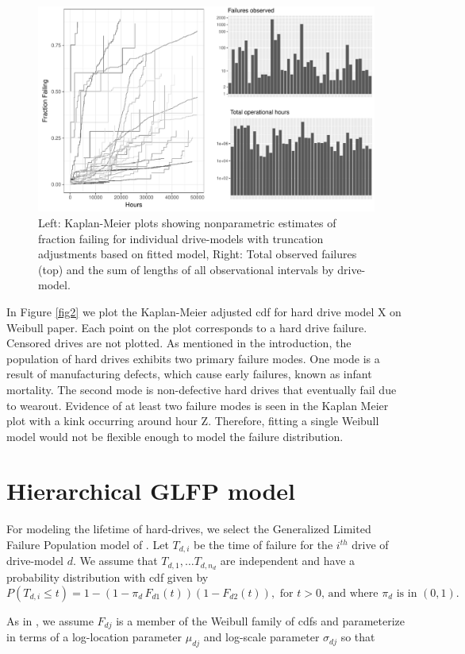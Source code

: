 \documentclass[12pt]{article}
\begin{document}
\begin{figure}
\includegraphics[width=.8\textwidth]{fig/data_overview}
\caption{Left: Kaplan-Meier plots showing nonparametric estimates of fraction failing for individual drive-models with truncation adjustments based on fitted model, Right: Total observed failures (top) and the sum of lengths of all observational intervals by drive-model.}
\end{figure}

In Figure \ref{fig2} we plot the Kaplan-Meier adjusted cdf for hard drive model X on Weibull paper.  Each point on the plot corresponds to a hard drive failure.  Censored drives are not plotted.  As mentioned in the introduction, the population of hard drives exhibits two primary failure modes.  One mode is a result of manufacturing defects, which cause early failures, known as infant mortality.  The second mode is non-defective hard drives that eventually fail due to wearout.   Evidence of at least two failure modes is seen in the Kaplan Meier plot with a kink occurring around hour Z.  Therefore, fitting a single Weibull model would not be flexible enough to model the failure distribution.


\section{Hierarchical GLFP model}
For modeling the lifetime of hard-drives, we select the Generalized Limited Failure Population model of \citet{chan}.
Let $T_{d,i}$ be the time of failure for the $i^{th}$ drive of drive-model $d$.
We assume that $T_{d,1},\ldots T_{d,n_d}$ are independent and have a probability distribution with cdf given by
$$P(T_{d,i}\le t) = 1 - (1-\pi_d\, F_{d1}(t))(1 - F_{d2}(t)), \mbox{ for }t>0 \mbox{, and where } \pi_d \mbox{ is in }(0,1).$$

As in \cite{chan}, we assume $F_{dj}$ is a member of the Weibull family of cdfs and parameterize in terms of a log-location parameter $\mu_{dj}$ and log-scale parameter $\sigma_{dj}$ so that
\end{document}

